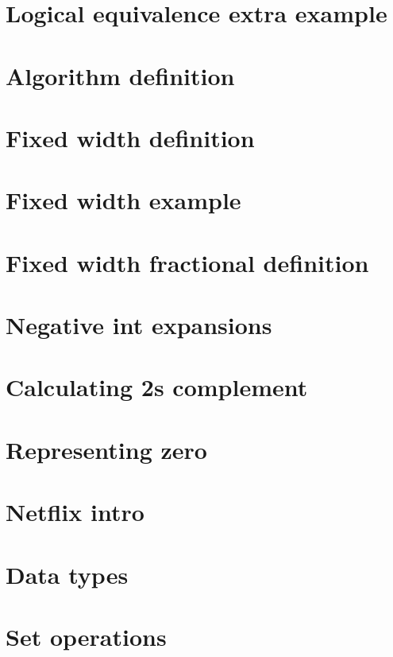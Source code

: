 \section*{Logical equivalence extra example}

\vfill
\section*{Algorithm definition}

\vfill
\section*{Fixed width definition}

\vfill
\section*{Fixed width example}

\vfill
\section*{Fixed width fractional definition}

\vfill
\section*{Negative int expansions}

\vfill
\section*{Calculating 2s complement}

\vfill
\section*{Representing zero}

\vfill
\section*{Netflix intro}

\vfill
\section*{Data types}

\vfill
\section*{Set operations}

\vfill
